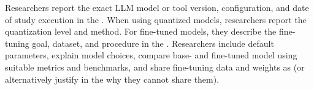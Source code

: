 Researchers \must report the exact LLM model or tool version, configuration, and date of study execution in the \paper. When using quantized models, researchers \should report the quantization level and method. For fine-tuned models, they \must describe the fine-tuning goal, dataset, and procedure in the \paper. Researchers \should include default parameters, explain model choices, compare base- and fine-tuned model using suitable metrics and benchmarks, and share fine-tuning data and weights as \supplementarymaterial (or alternatively justify in the \paper why they cannot share them).
